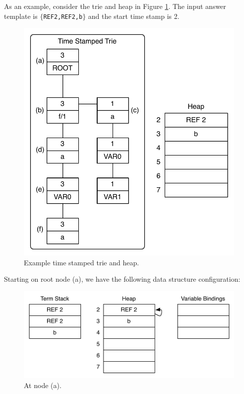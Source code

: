 As an example, consider the trie and heap in Figure \ref{fig:collect_variable}.
The input answer template is $\{$\texttt{REF2,REF2,b}$\}$ and the start time stamp is 2.

\begin{figure}[ht]
  \centering
    \includegraphics[scale=0.6]{collect_variable.pdf}
  \caption{Example time stamped trie and heap.}
  \label{fig:collect_variable}
\end{figure}

Starting on root node (a), we have the following data structure configuration:

\begin{figure}[H]
  \centering
    \includegraphics[scale=0.6]{collect_variable1.pdf}
  \caption{At node (a).}
  \label{fig:collect_variable1}
\end{figure}

